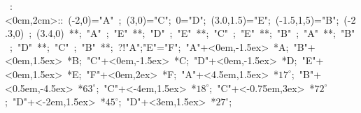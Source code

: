\hbox{
\xy    <2cm,0cm>:<0cm,2cm>::
       (-2,0)="A" ; (3,0)="C";  0="D";   
	   (3.0,1.5)="E";  (-1.5,1,5)="B";
	   (-2.3,0) ; (3.4,0) **\dir{-};  
       "A" ; "E" **\dir{-}; 
       "D" ; "E" **\dir{-}; 
       "C" ; "E" **\dir{-}; 
       "B" ; "A" **\dir{-}; 
       "B" ; "D" **\dir{-}; 
       "C" ; "B" **\dir{-}; 
       ?!{"A";"E"}="F";
	   "A"+<0em,-1.5ex> *{A};
	   "B"+<0em,1.5ex> *{B};
       "C"+<0em,-1.5ex> *{C};
       "D"+<0em,-1.5ex> *{D};
       "E"+<0em,1.5ex> *{E};
       "F"+<0em,2ex> *{F};
       "A"+<4.5em,1.5ex> *{\hbox{$17^{\circ}$}};
	   "B"+<0.5em,-4.5ex> *{\hbox{$63^{\circ}$}};
	   "C"+<-4em,1.5ex> *{\hbox{$18^{\circ}$}};
	   "C"+<-0.75em,3ex> *{\hbox{$72^{\circ}$}};
	   "D"+<-2em,1.5ex> *{\hbox{$45^{\circ}$}};
	   "D"+<3em,1.5ex> *{\hbox{$27^{\circ}$}};
	   \endxy}
